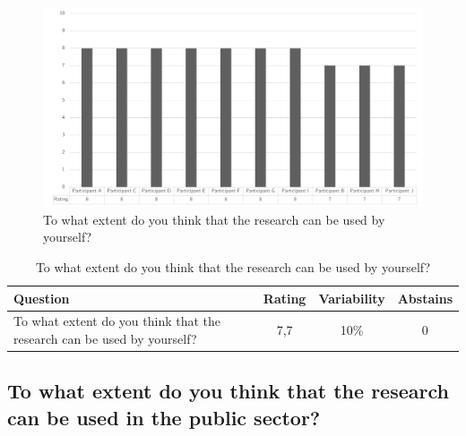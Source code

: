 \begin{figure}[H]
	\centering
	\includegraphics[width=0.9\linewidth]{images/validationresult_researchrelevanceexpert}
	\caption[To what extent do you think that the research can be used by yourself?]{To what extent do you think that the research can be used by yourself?}
	\label{fig:validationrelevantyourself}
\end{figure}
\begin{table}[H]
	\centering
	\begin{tabular}{p{}ccc}
		\toprule
		\textbf{Question} & \textbf{Rating} & \textbf{Variability} & \textbf{Abstains} \\
		\midrule
		To what extent do you think that the research can be used by yourself? & 7,7 & 10\% & 0 \\%
		\bottomrule
	\end{tabular}%
	\caption[To what extent do you think that the research can be used by yourself?]{To what extent do you think that the research can be used by yourself?}
	\label{tab:validationrelevantyourself}%
\end{table}%

\subsection{To what extent do you think that the research can be used in the public sector?}
\label{sub:validationrelevantps}

